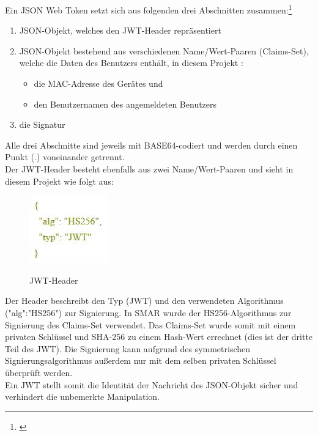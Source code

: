 Ein \ac{JSON} Web Token setzt sich aus folgenden drei Abschnitten zusammen:\footnote{\citep[S. 289f.]{book_jwt}}
\begin{enumerate}
	\item JSON-Objekt, welches den \acs{JWT}-Header repräsentiert
	\item JSON-Objekt bestehend aus verschiedenen Name/Wert-Paaren (Claims-Set), welche die Daten des Benutzers enthält, in diesem Projekt \zB:
	\begin{itemize}
		\item die \acs{MAC}-Adresse des Gerätes und
		\item den Benutzernamen des angemeldeten Benutzers
	\end{itemize}
	\item die Signatur
\end{enumerate}
Alle drei Abschnitte sind jeweils mit BASE64-codiert und werden durch einen Punkt (.) voneinander getrennt.\\

Der \acs{JWT}-Header besteht ebenfalls aus zwei Name/Wert-Paaren und sieht in diesem Projekt wie folgt aus:
\begin{figure}[H]
	\centering
	{\includegraphics[scale=1.0]{Bilder/jwt_header.jpg}}
	\caption{\acs{JWT}-Header}
	\label{fig:jwt_header}
\end{figure}
Der Header beschreibt den Typ (JWT) und den verwendeten Algorithmus  ("alg":"HS256")  zur Signierung. In \ac{SMAR} wurde der HS256-Algorithmus zur Signierung des Claims-Set verwendet. Das Claims-Set wurde somit mit einem privaten Schlüssel und SHA-256 zu einem Hash-Wert errechnet (dies ist der dritte Teil des \acs{JWT}). Die Signierung kann aufgrund des symmetrischen Signierungsalgorithmus außerdem nur mit dem selben privaten Schlüssel überprüft werden.\\
Ein \acl{JWT} stellt somit die Identität der Nachricht \bzw des \ac{JSON}-Objekt sicher und verhindert die unbemerkte Manipulation.\\

